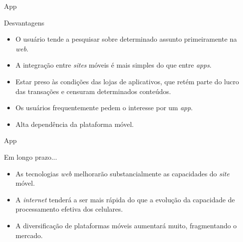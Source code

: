 \begin{frame}{App}
\begin{block}{Desvantagens}
  \begin{itemize}
    \item<1-> O usuário tende a pesquisar sobre determinado assunto primeiramente na \emph{web}.
    \item<2-> A integração entre \emph{sites} móveis é mais simples do que entre \emph{apps}.
    \item<3-> Estar preso às condições das lojas de aplicativos, que retém parte do lucro das transações e censuram determinados conteúdos.
    \item<4-> Os usuários frequentemente pedem o interesse por um \emph{app}.
    \item<5-> Alta dependência da plataforma móvel.
  \end{itemize}
\end{block}
\end{frame}

\begin{frame}{App}
\begin{block}{Em longo prazo...}
  \begin{itemize}
    \item<1-> As tecnologias \emph{web} melhorarão substancialmente as capacidades do \emph{site} móvel.
    \item<2-> A \emph{internet} tenderá a ser mais rápida do que a evolução da capacidade de processamento efetiva dos celulares.
    \item<3-> A diversificação de plataformas móveis aumentará muito, fragmentando o mercado.
  \end{itemize}
\end{block}
\end{frame}
